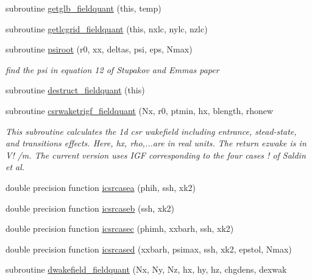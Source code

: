 \begin{DoxyCompactItemize}
\item 
subroutine \mbox{\hyperlink{namespacefieldquantclass_a2c0b0d0301e9ae5ccd8b2273ffc95ff3}{getglb\+\_\+fieldquant}} (this, temp)
\item 
subroutine \mbox{\hyperlink{namespacefieldquantclass_aa439599c2570610c1c2e0bfacc135603}{getlcgrid\+\_\+fieldquant}} (this, nxlc, nylc, nzlc)
\item 
subroutine \mbox{\hyperlink{namespacefieldquantclass_ae02f70d677d4bedfa6e41bd6cf33d612}{psiroot}} (r0, xx, deltas, psi, eps, Nmax)
\begin{DoxyCompactList}\small\item\em find the psi in equation 12 of Stupakov and Emma\textquotesingle{}s paper \end{DoxyCompactList}\item 
subroutine \mbox{\hyperlink{namespacefieldquantclass_a4e8922c1e25eef99306f4001c7289ba0}{destruct\+\_\+fieldquant}} (this)
\item 
subroutine \mbox{\hyperlink{namespacefieldquantclass_ac3c0238f350487871fdbe6a84bcdfc2e}{csrwaketrigf\+\_\+fieldquant}} (Nx, r0, ptmin, hx, blength, rhonew
\begin{DoxyCompactList}\small\item\em This subroutine calculates the 1d csr wakefield including entrance, stead-\/state, and transitions effects. Here, hx, rho,...are in real units. The return ezwake is in V! /m. The current version uses I\+GF corresponding to the four cases ! of Saldin et al. \end{DoxyCompactList}\item 
double precision function \mbox{\hyperlink{namespacefieldquantclass_a7431c26c185c399c546e1ac54043bad4}{icsrcasea}} (phih, ssh, xk2)
\item 
double precision function \mbox{\hyperlink{namespacefieldquantclass_ac6ac81d1607e424c294650bb3f89aa5c}{icsrcaseb}} (ssh, xk2)
\item 
double precision function \mbox{\hyperlink{namespacefieldquantclass_a85aac5a4f515439e4263b24518d8c9dc}{icsrcasec}} (phimh, xxbarh, ssh, xk2)
\item 
double precision function \mbox{\hyperlink{namespacefieldquantclass_a6e7b51293ed012f0a90b5de96a3cef05}{icsrcased}} (xxbarh, psimax, ssh, xk2, epstol, Nmax)
\item 
subroutine \mbox{\hyperlink{namespacefieldquantclass_a990a046cc996cb957a94c4995bfe803a}{dwakefield\+\_\+fieldquant}} (Nx, Ny, Nz, hx, hy, hz, chgdens, dexwak

\end{DoxyCompactItemize}
